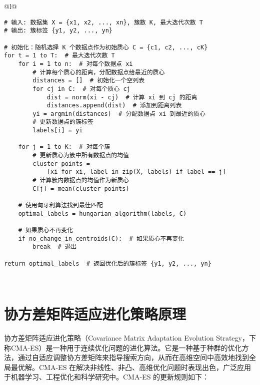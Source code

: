 \documentclass[master]{thesis-uestc}
\begin{document}
\begin{table}[h]
    \caption{KMeans算法伪代码}
    \begin{tabular}{@{}l@{}} %
    \toprule
     \\ %
    \midrule
    \begin{lstlisting}[basicstyle=\ttfamily,frame=none]
# 输入: 数据集 X = {x1, x2, ..., xn}, 簇数 K, 最大迭代次数 T
# 输出: 簇标签 {y1, y2, ..., yn}

# 初始化：随机选择 K 个数据点作为初始质心 C = {c1, c2, ..., cK}
for t = 1 to T:  # 最大迭代次数 T
    for i = 1 to n:  # 对每个数据点 xi
        # 计算每个质心的距离，分配数据点给最近的质心
        distances = []  # 初始化一个空列表
        for cj in C:  # 对每个质心 cj
            dist = norm(xi - cj)  # 计算 xi 到 cj 的距离
            distances.append(dist)  # 添加到距离列表
        yi = argmin(distances)  # 分配数据点 xi 到最近的质心
        # 更新数据点的簇标签
        labels[i] = yi
    
    for j = 1 to K:  # 对每个簇
        # 更新质心为簇中所有数据点的均值
        cluster_points = 
            [xi for xi, label in zip(X, labels) if label == j]
        # 计算簇内数据点的均值作为新质心
        C[j] = mean(cluster_points)
    
    # 使用匈牙利算法找到最佳匹配
    optimal_labels = hungarian_algorithm(labels, C)
    
    # 如果质心不再变化
    if no_change_in_centroids(C):  # 如果质心不再变化
        break  # 退出

return optimal_labels  # 返回优化后的簇标签 {y1, y2, ..., yn}
    \end{lstlisting} \\
    \bottomrule
    \end{tabular}
    \label{table:kmeans_code}
\end{table}
\section{协方差矩阵适应进化策略原理}
协方差矩阵适应进化策略（Covariance Matrix Adaptation Evolution Strategy，下称CMA-ES）是一种用于连续优化问题的进化算法。它是一种基于种群的优化方法，通过自适应调整协方差矩阵来指导搜索方向，从而在高维空间中高效地找到全局最优解。CMA-ES 在解决非线性、非凸、高维优化问题时表现出色，广泛应用于机器学习、工程优化和科学研究中。CMA-ES 的更新规则如下：
\end{document}
